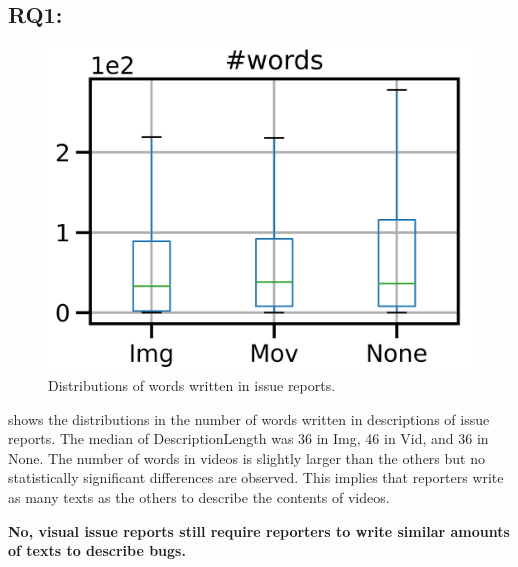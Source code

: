 

\subsection*{RQ1: \RQone{}}
\begin{figure}[t]
    \centering
    \includegraphics[width=0.5\linewidth]{./figures/words.png}
    \caption{Distributions of words written in issue reports. }
    \label{fig:words}
\end{figure}
 shows the distributions in the number of words 
written in descriptions of issue reports. 
The median of DescriptionLength was 36 in Img, 
46 in Vid, and 36 in None. 
The number of words in videos is slightly larger than 
the others but no statistically significant differences are observed. 
This implies that reporters write as many texts as the others 
to describe the contents of videos. 

\summarybox
{\bf No, visual issue reports still require reporters 
to write similar amounts of texts to describe bugs. 
}

